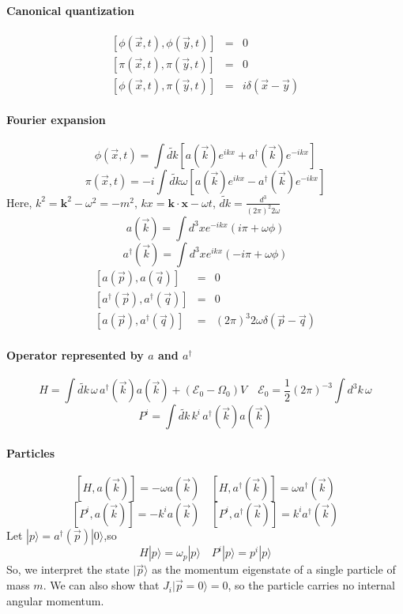 \documentclass{article}
\begin{document}
\paragraph{Canonical quantization}
\begin{eqnarray}
\left[\phi(\vec{x},t),\phi(\vec{y},t)\right] &=& 0 \nonumber \\
\left[\pi(\vec{x},t),\pi(\vec{y},t)\right] &=& 0 \nonumber \\
\left[\phi(\vec{x},t),\pi(\vec{y},t)\right] &=& i \delta(\vec{x}-\vec{y}) \nonumber
\end{eqnarray}
\paragraph{Fourier expansion}
\[\phi(\vec{x},t) = \int \widetilde{dk} \left[ a(\vec{k})e^{ikx} + a^{\dagger}(\vec{k})e^{-ikx} \right]\]
\[\pi(\vec{x},t) = -i \int  \widetilde{dk} \omega \left[ a(\vec{k})e^{ikx} - a^{\dagger}(\vec{k})e^{-ikx} \right]\]
Here, $k^2 = \mathbf{k}^2 - \omega^2 = -m^2$, $kx = \mathbf{k}\cdot \mathbf{x} - \omega t$, $\widetilde{dk} = \frac{d^3}{(2\pi)^2 2\omega}$
\[a(\vec{k}) = \int d^3 x e^{-ikx}(i\pi+\omega \phi)\]
\[a^{\dagger}(\vec{k}) = \int d^3 x e^{ikx}(-i\pi+\omega \phi)\]
\begin{eqnarray}
\left[a(\vec{p}),a(\vec{q})\right] &=& 0 \nonumber \\
\left[a^{\dagger}(\vec{p}),a^{\dagger}(\vec{q})\right] &=& 0 \nonumber \\
\left[a(\vec{p}),a^{\dagger}(\vec{q})\right] &=& (2\pi)^3 2\omega \delta(\vec{p}-\vec{q}) \nonumber
\end{eqnarray}
\paragraph{Operator represented by $a$ and $a^{\dagger}$}
\[H=\int \widetilde{dk}\, \omega\, a^{\dagger}(\vec{k})a(\vec{k}) + (\mathcal{E}_0 - \Omega_0)V \quad \mathcal{E}_0 = \frac{1}{2}(2\pi)^{-3}\int d^3 k \,\omega\]
\[P^{i}=\int \widetilde{dk}\, k^{i}\, a^{\dagger}(\vec{k})a(\vec{k}) \]
\paragraph{Particles}
\[[H,a(\vec{k})] = -\omega a(\vec{k}) \quad [H,a^{\dagger}(\vec{k})] = \omega a^{\dagger}(\vec{k})\]
\[[P^i,a(\vec{k})] = -k^i a(\vec{k}) \quad [P^i,a^{\dagger}(\vec{k})] = k^i a^{\dagger}(\vec{k})\]
Let $|p\rangle = a^{\dagger}(\vec{p})|0\rangle $,so
\[H |p\rangle = \omega_p|p\rangle \quad P^i |p\rangle = p^i|p\rangle\]
So, we interpret the state $|\vec{p}\rangle$ as the momentum eigenstate of a single particle of mass $m$. We can also show that 
$J_i|\vec{p} = 0\rangle = 0$, so the particle carries no internal angular momentum.
\end{document}
